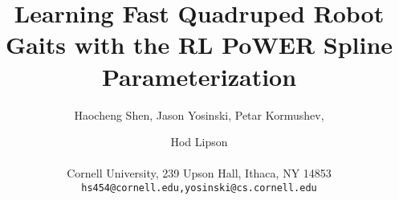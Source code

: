 \documentclass[letterpaper]{article}
\title{Learning Fast Quadruped Robot Gaits with the RL PoWER Spline Parameterization}
\author{Haocheng Shen, Jason Yosinski, Petar Kormushev, \and Hod Lipson  \\
  \mbox{}\\
Cornell University, 239 Upson Hall, Ithaca, NY 14853 \\
\texttt{hs454@cornell.edu,yosinski@cs.cornell.edu}}
\begin{document}
\maketitle


\begin{abstract}

\end{abstract}
























\footnotesize


\end{document}
